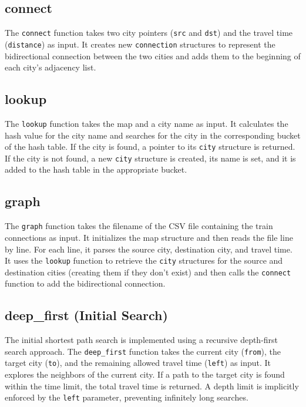 \documentclass[a4paper,11pt]{article}
\begin{document}
\subsection*{connect}
The \texttt{connect} function takes two city pointers (\texttt{src} and \texttt{dst}) and the travel time (\texttt{distance}) as input. It creates new \texttt{connection} structures to represent the bidirectional connection between the two cities and adds them to the beginning of each city's adjacency list.

\subsection*{lookup}
The \texttt{lookup} function takes the map and a city name as input. It calculates the hash value for the city name and searches for the city in the corresponding bucket of the hash table. If the city is found, a pointer to its \texttt{city} structure is returned. If the city is not found, a new \texttt{city} structure is created, its name is set, and it is added to the hash table in the appropriate bucket.

\subsection*{graph}
The \texttt{graph} function takes the filename of the CSV file containing the train connections as input. It initializes the map structure and then reads the file line by line. For each line, it parses the source city, destination city, and travel time. It uses the \texttt{lookup} function to retrieve the \texttt{city} structures for the source and destination cities (creating them if they don't exist) and then calls the \texttt{connect} function to add the bidirectional connection.

\subsection*{deep\_first (Initial Search)}
The initial shortest path search is implemented using a recursive depth-first search approach. The \texttt{deep\_first} function takes the current city (\texttt{from}), the target city (\texttt{to}), and the remaining allowed travel time (\texttt{left}) as input. It explores the neighbors of the current city. If a path to the target city is found within the time limit, the total travel time is returned. A depth limit is implicitly enforced by the \texttt{left} parameter, preventing infinitely long searches.
\end{document}
